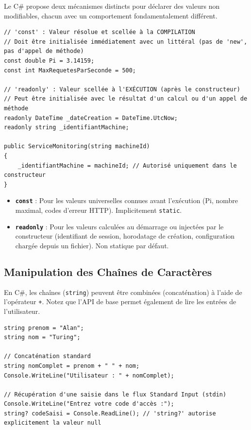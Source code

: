 Le C\# propose deux mécanismes distincts pour déclarer des valeurs non modifiables, chacun avec un comportement fondamentalement différent.

\begin{lstlisting}[caption={Déclaration de constantes et champs readonly}]
// 'const' : Valeur résolue et scellée à la COMPILATION
// Doit être initialisée immédiatement avec un littéral (pas de 'new', pas d'appel de méthode)
const double Pi = 3.14159;
const int MaxRequetesParSeconde = 500;

// 'readonly' : Valeur scellée à l'EXÉCUTION (après le constructeur)
// Peut être initialisée avec le résultat d'un calcul ou d'un appel de méthode
readonly DateTime _dateCreation = DateTime.UtcNow;
readonly string _identifiantMachine;

public ServiceMonitoring(string machineId)
{
    _identifiantMachine = machineId; // Autorisé uniquement dans le constructeur
}
\end{lstlisting}

\begin{tcolorbox}[colback=backcolour,colframe=keywordcolor,title=\textbf{Règle : \texttt{const} vs \texttt{readonly}}]
    \begin{itemize}
        \item \textbf{\texttt{const}} : Pour les valeurs universelles connues avant l'exécution (Pi, nombre maximal, codes d'erreur HTTP). Implicitement \texttt{static}.
        \item \textbf{\texttt{readonly}} : Pour les valeurs calculées au démarrage ou injectées par le constructeur (identifiant de session, horodatage de création, configuration chargée depuis un fichier). Non statique par défaut.
    \end{itemize}
\end{tcolorbox}

\subsection{Manipulation des Chaînes de Caractères}

En C\#, les chaînes (\texttt{string}) peuvent être combinées (concaténation) à l'aide de l'opérateur \texttt{+}. Notez que l'API de base permet également de lire les entrées de l'utilisateur.

\begin{lstlisting}[caption={Concaténation et récupération d'entrées}]
string prenom = "Alan";
string nom = "Turing";

// Concaténation standard
string nomComplet = prenom + " " + nom;
Console.WriteLine("Utilisateur : " + nomComplet);

// Récupération d'une saisie dans le flux Standard Input (stdin)
Console.WriteLine("Entrez votre code d'accès :");
string? codeSaisi = Console.ReadLine(); // 'string?' autorise explicitement la valeur null
\end{lstlisting}

